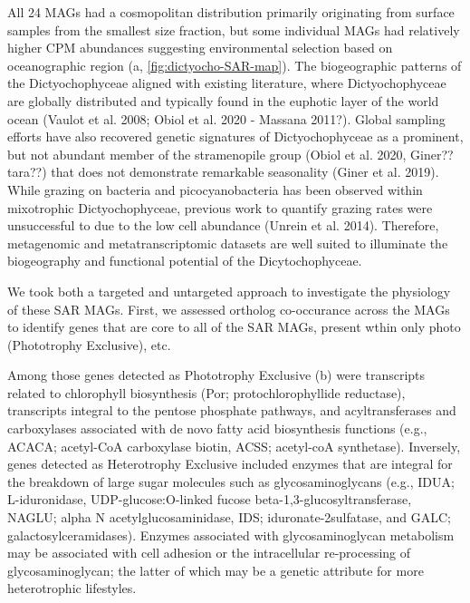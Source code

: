 \documentclass[12pt]{article}
\numberwithin{equation}{section}
\begin{document}
All 24 MAGs had a cosmopolitan distribution primarily originating from surface samples from the smallest size fraction, but some individual MAGs had relatively higher CPM abundances suggesting environmental selection based on oceanographic region (a, \ref{fig:dictyocho-SAR-map}). The biogeographic patterns of the Dictyochophyceae aligned with existing literature, where Dictyochophyceae are globally distributed and typically found in the euphotic layer of the world ocean (Vaulot et al. 2008; Obiol et al. 2020 - Massana 2011?). Global sampling efforts have also recovered genetic signatures of Dictyochophyceae as a prominent, but not abundant member of the stramenopile group (Obiol et al. 2020, Giner?? tara??) that does not demonstrate remarkable seasonality (Giner et al. 2019). While grazing on bacteria and picocyanobacteria has been observed within mixotrophic Dictyochophyceae, previous work to quantify grazing rates were unsuccessful to due to the low cell abundance (Unrein et al. 2014). Therefore, metagenomic and metatranscriptomic datasets are well suited to illuminate the biogeography and functional potential of the Dicytochophyceae.



We took both a targeted and untargeted approach to investigate the physiology of these SAR MAGs. First, we assessed ortholog co-occurance across the MAGs to identify genes that are core to all of the SAR MAGs, present wthin only photo (Phototrophy Exclusive), etc. 

Among those genes detected as Phototrophy Exclusive (b) were transcripts related to chlorophyll biosynthesis (Por; protochlorophyllide reductase), transcripts integral to the pentose phosphate pathways, and acyltransferases and carboxylases associated with de novo fatty acid biosynthesis functions (e.g., ACACA; acetyl-CoA carboxylase biotin, ACSS; acetyl-coA synthetase). Inversely, genes detected as Heterotrophy Exclusive included enzymes that are integral for the breakdown of large sugar molecules such as glycosaminoglycans (e.g., IDUA; L-iduronidase, UDP-glucose:O-linked fucose beta-1,3-glucosyltransferase, NAGLU; alpha N acetylglucosaminidase, IDS; iduronate-2sulfatase, and GALC; galactosylceramidases). Enzymes associated with glycosaminoglycan metabolism may be associated with cell adhesion or the intracellular re-processing of glycosaminoglycan; the latter of which may be a genetic attribute for more heterotrophic lifestyles. 
\end{document}
